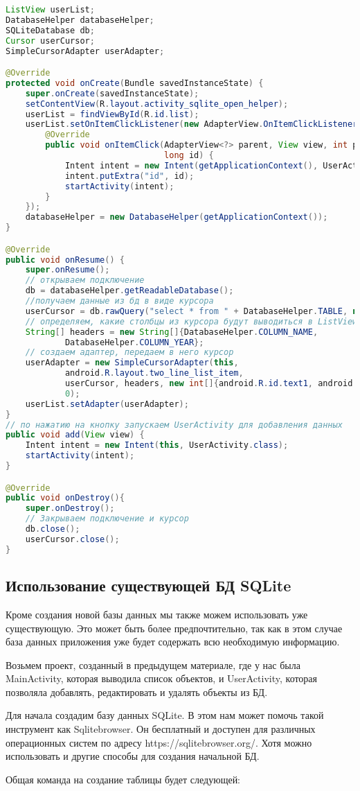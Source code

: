 \begin{lstlisting}[language=Java
	, label=lst:
	]
ListView userList;
DatabaseHelper databaseHelper;
SQLiteDatabase db;
Cursor userCursor;
SimpleCursorAdapter userAdapter;

@Override
protected void onCreate(Bundle savedInstanceState) {
	super.onCreate(savedInstanceState);
	setContentView(R.layout.activity_sqlite_open_helper);
	userList = findViewById(R.id.list);
	userList.setOnItemClickListener(new AdapterView.OnItemClickListener() {
		@Override
		public void onItemClick(AdapterView<?> parent, View view, int position,
								long id) {
			Intent intent = new Intent(getApplicationContext(), UserActivity.class);
			intent.putExtra("id", id);
			startActivity(intent);
		}
	});
	databaseHelper = new DatabaseHelper(getApplicationContext());
}

@Override
public void onResume() {
	super.onResume();
	// открываем подключение
	db = databaseHelper.getReadableDatabase();
	//получаем данные из бд в виде курсора
	userCursor = db.rawQuery("select * from " + DatabaseHelper.TABLE, null);
	// определяем, какие столбцы из курсора будут выводиться в ListView
	String[] headers = new String[]{DatabaseHelper.COLUMN_NAME,
			DatabaseHelper.COLUMN_YEAR};
	// создаем адаптер, передаем в него курсор
	userAdapter = new SimpleCursorAdapter(this,
			android.R.layout.two_line_list_item,
			userCursor, headers, new int[]{android.R.id.text1, android.R.id.text2},
			0);
	userList.setAdapter(userAdapter);
}
// по нажатию на кнопку запускаем UserActivity для добавления данных
public void add(View view) {
	Intent intent = new Intent(this, UserActivity.class);
	startActivity(intent);
}

@Override
public void onDestroy(){
	super.onDestroy();
	// Закрываем подключение и курсор
	db.close();
	userCursor.close();
}
\end{lstlisting}

\subsection{Использование существующей БД SQLite}
Кроме создания новой базы данных мы также можем использовать уже
существующую. Это может быть более предпочтительно, так как в этом
случае база данных приложения уже будет содержать всю необходимую
информацию.\par
Возьмем проект, созданный в предыдущем материале, где у нас была
MainActivity, которая выводила список объектов, и UserActivity, которая
позволяла добавлять, редактировать и удалять объекты из БД.\par
Для начала создадим базу данных SQLite. В этом нам может помочь такой
инструмент как Sqlitebrowser. Он бесплатный и доступен для различных
операционных систем по адресу https://sqlitebrowser.org/. Хотя можно
использовать и другие способы для создания начальной БД.\par
Общая команда на создание таблицы будет следующей:

